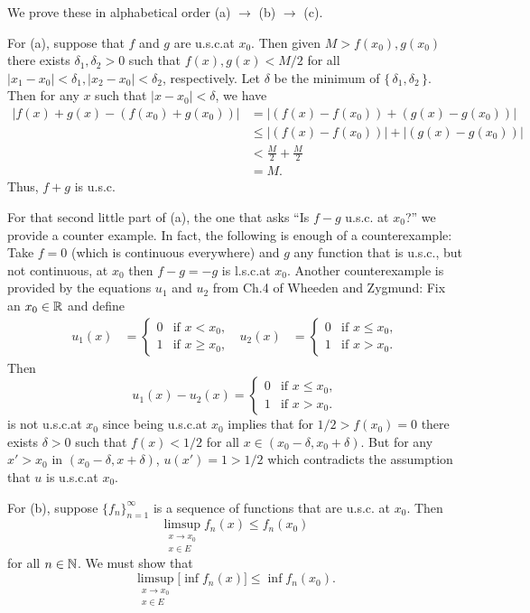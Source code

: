 \begin{solution}
  We prove these in alphabetical order (a) $\to$ (b) $\to$ (c).

  For (a), suppose that $f$ and $g$ are u.s.c.\@ at $x_0$. Then given
  $M>f(x_0),g(x_0)$ there exists $\delta_1,\delta_2>0$ such that
  $f(x),g(x)<M/2$ for all $|x_1-x_0|<\delta_1,|x_2-x_0|<\delta_2$,
  respectively. Let $\delta$ be the minimum of
  $\{\,\delta_1,\delta_2\,\}$. Then for any $x$ such that $|x-x_0|<\delta$,
  we have
  \begin{align*}
    |f(x)+g(x)-(f(x_0)+g(x_0))|
    &=|(f(x)-f(x_0))+(g(x)-g(x_0))|\\
    &\leq |(f(x)-f(x_0))|+|(g(x)-g(x_0))|\\
    &<\frac{M}{2}+\frac{M}{2}\\
    &=M.
  \end{align*}
  Thus, $f+g$ is u.s.c.

  For that second little part of (a), the one that asks ``Is $f-g$ u.s.c.\@
  at $x_0$?'' we provide a counter example. In fact, the following is enough of a
  counterexample: Take $f=0$ (which is continuous everywhere) and $g$ any
  function that is u.s.c.\@, but not continuous, at $x_0$ then $f-g=-g$ is
  l.s.c.\@ at $x_0$. Another counterexample is provided by the equations
  $u_1$ and $u_2$ from Ch.\@ 4 of Wheeden and Zygmund: Fix an $x_0\in\mathbb{R}$
  and define
  \begin{align*}
    u_1(x)&=\begin{cases}
      0&\text{if $x<x_0$,}\\
      1&\text{if $x\geq x_0$,}
    \end{cases}
    &
    u_2(x)&=\begin{cases}
      0&\text{if $x\leq x_0$,}\\
      1&\text{if $x>x_0$.}
    \end{cases}
  \end{align*}
  Then
  \[
    u_1(x)-u_2(x)=
    \begin{cases}
      0&\text{if $x\leq x_0$,}\\
      1&\text{if $x>x_0$.}
    \end{cases}
  \]
  is not u.s.c.\@ at $x_0$ since being u.s.c.\@ at $x_0$ implies that for
  $1/2>f(x_0)=0$ there exists $\delta>0$ such that $f(x)<1/2$ for all
  $x\in (x_0-\delta,x_0+\delta)$. But for any $x'>x_0$ in
  $(x_0-\delta,x+\delta)$, $u(x')=1>1/2$ which contradicts the assumption
  that $u$ is u.s.c.\@ at $x_0$.

  For (b), suppose $\{f_n\}_{n=1}^\infty$ is a sequence of functions that are u.s.c.\@
  at $x_0$. Then
  \[
    \limsup_{\substack{x\to x_0\\ x\in E}}f_n(x)\leq f_n(x_0)
  \]
  for all $n\in\mathbb{N}$. We must show that
  \[
    \limsup_{\substack{x\to x_0\\ x\in E}}\bigl[\inf f_n(x)\bigr]\leq \inf
    f_n(x_0).
  \]
\end{solution}

